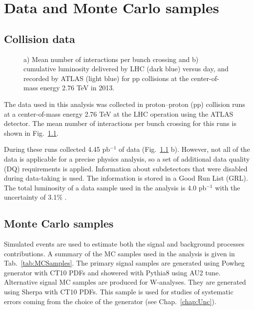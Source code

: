 \chapter{Data and Monte Carlo samples}\label{chap:DataSample}
\minitoc

\section{Collision data}

\begin{figure}[!b]
\begin{minipage}[h]{0.49\linewidth}
\end{minipage}
\hfill
\begin{minipage}[h]{0.49\linewidth}
\end{minipage}
\caption{a) Mean number of interactions per bunch crossing and b) cumulative luminosity  delivered by LHC (dark blue) versus day, and recorded by ATLAS (light blue) for pp collisions at the center-of-mass energy 2.76 TeV in 2013.}
\label{ris:DataSampleMu}
\end{figure}
The data used in this analysis was collected in proton--proton (pp) collision runs at a center-of-mass energy 2.76 TeV at the LHC operation using the ATLAS detector. The mean number of interactions per bunch crossing for this runs is shown in Fig.~\ref{ris:DataSampleMu}. 

During these runs \atlas collected 4.45 pb$^{-1}$ of data (Fig.~\ref{ris:DataSampleMu} b). However, not all of the data is applicable for a precise physics analysis, so a set of additional data quality (DQ) requirements is applied.  Information about subdetectors that were disabled during data-taking is used. The information is stored in a Good Run List (GRL). The total luminosity of a data sample used in the analysis is 4.0 pb$^{-1}$ with the uncertainty  of 3.1\% \cite{myLumi}.

\section{Monte Carlo samples}

Simulated events are used to estimate both the signal and background processes contributions. A summary of the MC samples used in the analysis is given in Tab.~\ref{tab:MCSamples}. The primary signal samples are generated using Powheg generator with CT10\cite{NewPartonD} PDFs and showered with Pythia8 using AU2\cite{ATL-PHYS-PUB-2012-003} tune. Alternative signal MC samples are produced for W-analyses. They are generated using Sherpa with CT10 PDFs. This sample is used for studies of systematic errors coming from the choice of the generator (see Chap.~\ref{chap:Unc}).

